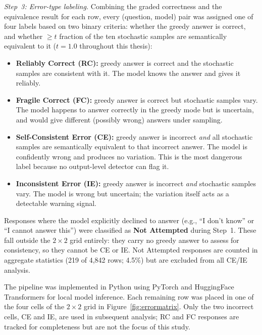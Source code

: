 \documentclass[12pt,twocolumn]{article}
\begin{document}
\textit{Step~3: Error-type labeling.}
Combining the graded correctness and the equivalence result for each
row, every (question, model) pair was assigned one of four labels
based on two binary criteria: whether the greedy answer is correct,
and whether $\geq t$ fraction of the ten stochastic samples are
semantically equivalent to it ($t{=}1.0$ throughout this thesis):

\begin{itemize}[nosep]
\item \textbf{Reliably Correct (RC):} greedy answer is correct and
  the stochastic samples are consistent with it. The model knows the
  answer and gives it reliably.
\item \textbf{Fragile Correct (FC):} greedy answer is correct but
  stochastic samples vary. The model happens to answer correctly in
  the greedy mode but is uncertain, and would give different
  (possibly wrong) answers under sampling.
\item \textbf{Self-Consistent Error (CE):} greedy answer is
  incorrect \emph{and} all stochastic samples are semantically
  equivalent to that incorrect answer. The model is confidently
  wrong and produces no variation. This is the most dangerous label
  because no output-level detector can flag it.
\item \textbf{Inconsistent Error (IE):} greedy answer is incorrect
  \emph{and} stochastic samples vary. The model is wrong but
  uncertain; the variation itself acts as a detectable warning
  signal.
\end{itemize}

Responses where the model explicitly declined to answer (e.g.,
``I don't know'' or ``I cannot answer this'') were classified as
\textbf{Not Attempted} during Step~1. These fall outside the
$2{\times}2$ grid entirely: they carry no greedy answer to assess
for consistency, so they cannot be CE or IE. Not Attempted responses
are counted in aggregate statistics (219 of 4,842 rows; 4.5\%) but
are excluded from all CE/IE analysis.

The pipeline was implemented in Python using PyTorch
\citep{paszke2019pytorch} and HuggingFace Transformers
\citep{wolf2020transformers} for local model inference.
Each remaining row was placed in one of the four cells of the
$2{\times}2$ grid in Figure~\ref{fig:errormatrix}. Only the two
incorrect cells, CE and IE, are used in subsequent analysis; RC and
FC responses are tracked for completeness but are not the focus of
this study.
\end{document}
